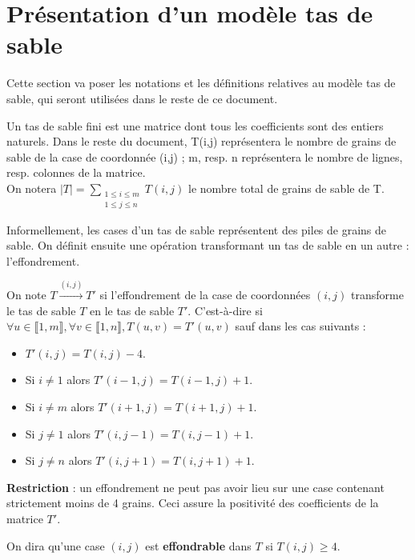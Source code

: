 \section{Présentation d'un modèle tas de sable}
Cette section va poser les notations et les définitions relatives au modèle tas de sable, qui seront utilisées dans le reste de ce document.


\begin{definition}

Un tas de sable fini est une matrice dont tous les coefficients sont des entiers naturels.
Dans le reste du document, T(i,j) représentera le nombre de grains de sable de la case de coordonnée (i,j) ;
m, resp. n  représentera le nombre de lignes, resp. colonnes de la matrice.\\
On notera $|T|= \sum\limits_{\substack{1 \leq i\leq m\\ 1 \leq j\leq n}} T(i,j)$ le nombre total de grains de sable de T.
\end{definition}

Informellement, les cases d'un tas de sable représentent des piles de grains de sable.
On définit ensuite une opération transformant un tas de sable en un autre : l'effondrement.

\begin{definition}

On note $T\xrightarrow{(i,j)}T'$ si l'effondrement de la case de coordonnées $(i,j)$ transforme le tas de sable $T$ en le tas de sable $T'$. C'est-à-dire si $\forall u\in\llbracket 1,m\rrbracket, \forall v\in \llbracket 1,n\rrbracket ,T(u,v)=T'(u,v)$ sauf dans les cas suivants :

\begin{itemize}
\item $T'(i,j)=T(i,j)-4$.
\item Si $i\neq 1$ alors $T'(i-1,j)=T(i-1,j)+1$.
\item Si $i\neq m$ alors $T'(i+1,j)=T(i+1,j)+1$.
\item Si $j\neq 1$ alors $T'(i,j-1)=T(i,j-1)+1$.
\item Si $j\neq n$ alors $T'(i,j+1)=T(i,j+1)+1$.
\end{itemize}
\textbf{Restriction} : un effondrement ne peut pas avoir lieu sur une case contenant strictement moins de 4 grains. Ceci assure la positivité des coefficients de la matrice $T'$.

On dira qu'une case $(i,j)$ est \textbf{effondrable} dans $T$ si $T(i,j)\geqslant4$.
\end{definition}



